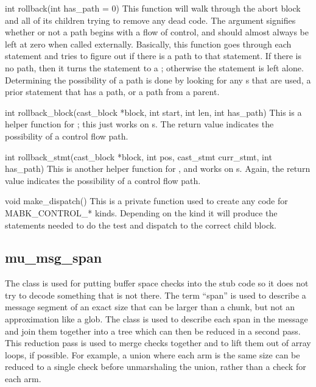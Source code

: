 \begin{cprototypelist}
  \item[int rollback(int has_path = 0)] This function will walk through the
  abort block and all of its children trying to remove any dead code.  The
   argument signifies whether or not a path begins with a
  flow of control, and should almost always be left at zero when called
  externally.  Basically, this function goes through each statement and tries
  to figure out if there is a path to that statement.  If there is no path,
  then it turns the statement to a ; otherwise the
  statement is left alone.  Determining the possibility of a path is done by
  looking for any s that are used, a prior statement that has
  a path, or a path from a parent.

  \item[int rollback_block(cast_block *block, int start, int len,
  int has_path)] This is a helper function for ; this just
  works on s.  The return value indicates the possibility of
  a control flow path.

  \item[int rollback_stmt(cast_block *block, int pos, cast_stmt
  curr_stmt, int has_path)] This is another helper function for
  , and works on s.  Again, the return
  value indicates the possibility of a control flow path.

  \item[void make_dispatch()] This is a private function used to
  create any code for MABK\_CONTROL\_* kinds.  Depending on the kind it will
  produce the statements needed to do the test and dispatch to the correct
  child block.
\end{cprototypelist}

\subsection{mu\_msg\_span}
\label{subsec:BE:mumsgspan}

The  class is used for putting buffer space checks into the
stub code so it does not try to decode something that is not there.  The term
``span'' is used to describe a message segment of an exact size that can be
larger than a chunk, but not an approximation like a glob.  The class is
used to describe each span in the message and join them together into a tree
which can then be reduced in a second pass.  This reduction pass is used to
merge checks together and to lift them out of array loops, if possible.
For example, a union where each arm is the same size can be reduced to a single
check before unmarshaling the union, rather than a check for each arm.

